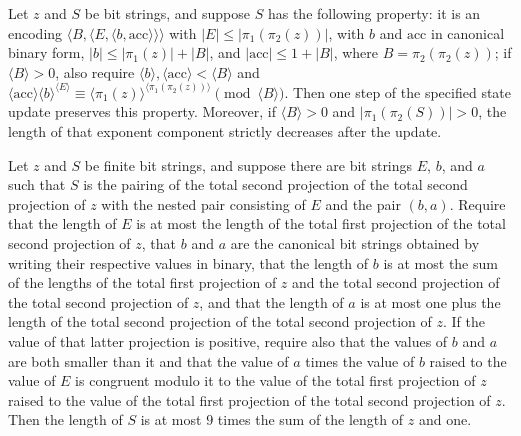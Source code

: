 \begin{theorem}
\label{Complexity.BinArith.powInv_step}
\leanok
{}
Let $z$ and $S$ be bit strings, and suppose $S$ has the following property: it is an
encoding $\langle B,\langle E,\langle b,\mathrm{acc}\rangle\rangle\rangle$ with $|E|\leq
|\pi_1(\pi_2(z))|$, with $b$ and $\mathrm{acc}$ in canonical binary form, $|b|\leq
|\pi_1(z)|+|B|$, and $|\mathrm{acc}|\leq 1+|B|$, where $B=\pi_2(\pi_2(z))$; if $\langle
B\rangle>0$, also require $\langle b\rangle,\langle\mathrm{acc}\rangle<\langle B\rangle$
and $\langle\mathrm{acc}\rangle\langle b\rangle^{\langle
E\rangle}\equiv\langle\pi_1(z)\rangle^{\langle\pi_1(\pi_2(z))\rangle}\pmod{\langle
B\rangle}$. Then one step of the specified state update preserves this property.
Moreover, if $\langle B\rangle>0$ and $|\pi_1(\pi_2(S))|>0$, the length of that exponent
component strictly decreases after the update.
\end{theorem}

\begin{theorem}
\label{Complexity.BinArith.length_le_of_powInv}
\leanok
{}
Let $z$ and $S$ be finite bit strings, and suppose there are bit strings $E$, $b$, and
$a$ such that $S$ is the pairing of the total second projection of the total second
projection of $z$ with the nested pair consisting of $E$ and the pair $(b,a)$. Require
that the length of $E$ is at most the length of the total first projection of the total
second projection of $z$, that $b$ and $a$ are the canonical bit strings obtained by
writing their respective values in binary, that the length of $b$ is at most the sum of
the lengths of the total first projection of $z$ and the total second projection of the
total second projection of $z$, and that the length of $a$ is at most one plus the
length of the total second projection of the total second projection of $z$. If the
value of that latter projection is positive, require also that the values of $b$ and $a$
are both smaller than it and that the value of $a$ times the value of $b$ raised to the
value of $E$ is congruent modulo it to the value of the total first projection of $z$
raised to the value of the total first projection of the total second projection of $z$.
Then the length of $S$ is at most $9$ times the sum of the length of $z$ and one.
\end{theorem}

